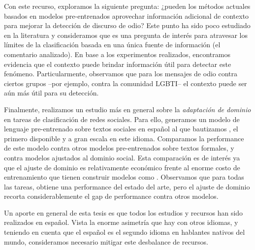 Con este recurso, exploramos la siguiente pregunta: ¿pueden los métodos actuales basados en modelos pre-entrenados aprovechar información adicional de contexto para mejorar la detección de discurso de odio? Este punto ha sido poco estudiado en la literatura y consideramos que es una pregunta de interés para atravesar los límites de la clasificación basada en una única fuente de información (el comentario analizado). En base a los experimentos realizados, encontramos evidencia que el contexto puede brindar información útil para detectar este fenómeno. Particularmente, observamos que para los mensajes de odio contra ciertos grupos --por ejemplo, contra la comunidad LGBTI-- el contexto puede ser aún más útil para su detección.

Finalmente, realizamos un estudio más en general sobre la \emph{adaptación de dominio} en tareas de clasificación de redes sociales. Para ello, generamos un modelo de lenguaje pre-entrenado sobre textos sociales en español al que bautizamos \robertuito{}, el primero disponible y a gran escala en este idioma. Comparamos la performance de este modelo contra otros modelos pre-entrenados sobre textos formales, y contra modelos ajustados al dominio social. Esta comparación es de interés ya que el ajuste de dominio es relativamente económico frente al enorme costo de entrenamiento que tienen construir modelos como \robertuito{}. Observamos que para todas las tareas, \robertuito{} obtiene una performance del estado del arte, pero el ajuste de dominio recorta considerablemente el gap de performance contra otros modelos.

Un aporte en general de esta tesis es que todos los estudios y recursos han sido realizados en español. Vista la enorme asimetría que hay con otros idiomas, y teniendo en cuenta que el español es el segundo idioma en hablantes nativos del mundo, consideramos necesario mitigar este desbalance de recursos.
